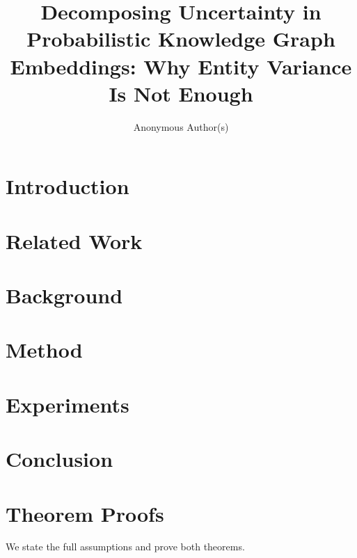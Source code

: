 \documentclass[accepted]{uai2024}  %
\title{Decomposing Uncertainty in Probabilistic Knowledge Graph Embeddings: Why Entity Variance Is Not Enough}
\author{
  Anonymous Author(s)
}
\begin{document}
\maketitle

\begin{abstract}

\end{abstract}

\section{Introduction}
\label{sec:intro}


\section{Related Work}
\label{sec:related}


\section{Background}
\label{sec:background}


\section{Method}
\label{sec:method}


\section{Experiments}
\label{sec:experiments}


\section{Conclusion}
\label{sec:conclusion}




\appendix

\section{Theorem Proofs}
\label{app:proof}

We state the full assumptions and prove both theorems.
\end{document}
